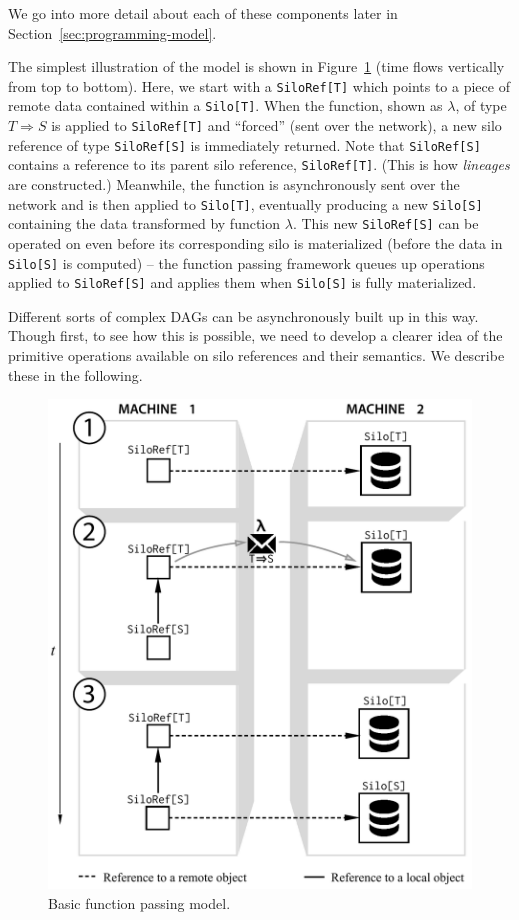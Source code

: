 \documentclass{jfp1}
\begin{document}
We go into more detail about each of these components later in Section~\ref{sec:programming-model}. 

The simplest illustration of the model is shown in
Figure~\ref{fig:basic-diagram} (time flows vertically from top to bottom). Here,
we start with a \verb|SiloRef[T]| which points to a piece of remote data
contained within a \verb|Silo[T]|. When the function, shown as $\lambda$, of
type $T \Rightarrow S$ is applied to \verb|SiloRef[T]| and ``forced'' (sent over
the network), a new silo reference of type \verb|SiloRef[S]| is immediately
returned. Note that \verb|SiloRef[S]| contains a reference to its parent silo
reference, \verb|SiloRef[T]|. (This is how {\em lineages} are constructed.)
Meanwhile, the function is asynchronously sent over the network and is then applied
to \verb|Silo[T]|, eventually producing a new \verb|Silo[S]| containing the data
transformed by function $\lambda$. This new \verb|SiloRef[S]| can be operated on
even before its corresponding silo is materialized (\ie before the data in
\verb|Silo[S]| is computed) – the function passing framework queues up
operations applied to \verb|SiloRef[S]| and applies them when \verb|Silo[S]| is
fully materialized.

Different sorts of complex DAGs can be asynchronously built up in this way.
Though first, to see how this is possible, we need to develop a clearer idea of
the primitive operations available on silo references and their semantics. We
describe these in the following.

\begin{figure}[ht!]
\centering\includegraphics[width=0.8\columnwidth]{pic/basic-diagram.pdf}
\caption{Basic function passing model.}\label{fig:basic-diagram}
\end{figure}
\end{document}
